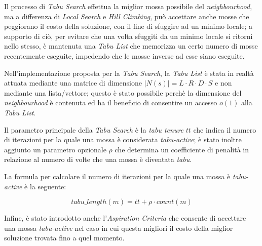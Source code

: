 \documentclass[]{article}
\begin{document}
Il processo di \textit{Tabu Search} effettua la miglior mossa possibile del \textit{neighbourhood}, ma a differenza di \textit{Local Search} e \textit{Hill Climbing}, può accettare anche mosse che peggiorano il costo della soluzione, con il fine di sfuggire ad un minimo locale; a supporto di ciò, per evitare che una volta sfuggiti da un minimo locale si ritorni nello stesso, è mantenuta una \textit{Tabu List} che memorizza un certo numero di mosse recentemente eseguite, impedendo che le mosse inverse ad esse siano eseguite.

Nell'implementazione proposta per la \textit{Tabu Search}, la \textit{Tabu List} è stata in realtà attuata mediante una matrice di dimensione $|N(s)| = L \cdot R \cdot D \cdot S$ e non mediante una lista/vettore; questo è stato possibile perchè la dimensione del \textit{neighbourhood} è contenuta ed ha il beneficio di consentire un accesso $o(1)$ alla \textit{Tabu List}.

Il parametro principale della \textit{Tabu Search} è la \textit{tabu tenure} $tt$ che indica il numero di iterazioni per la quale una mossa è considerata \textit{tabu-active}; è stato inoltre aggiunto un parametro opzionale $\rho$ che determina un coefficiente di penalità in relazione al numero di volte che una mossa è diventata \textit{tabu}.

La formula per calcolare il numero di iterazioni per la quale una mossa è \textit{tabu-active} è la seguente:

\[tabu\_length(m) = tt + \rho \cdot count(m)\]

Infine, è stato introdotto anche l'\textit{Aspiration Criteria} che consente di accettare una mossa \textit{tabu-active} nel caso in cui questa migliori il costo della miglior soluzione trovata fino a quel momento.
\end{document}
